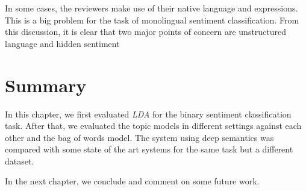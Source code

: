 In some cases, the reviewers make use of their native language and expressions. This is a big problem for the task of monolingual sentiment classification. From this discussion, it is clear that two major points of concern are unstructured language and hidden sentiment

\section*{Summary}

In this chapter, we first evaluated \textit{LDA} for the binary sentiment classification task. After that, we evaluated the topic models in different settings against
each other and the bag of words model. The system using deep semantics was compared with some state of the art systems for the same task but a different dataset.

In the next chapter, we conclude and comment on some future work.

\clearpage